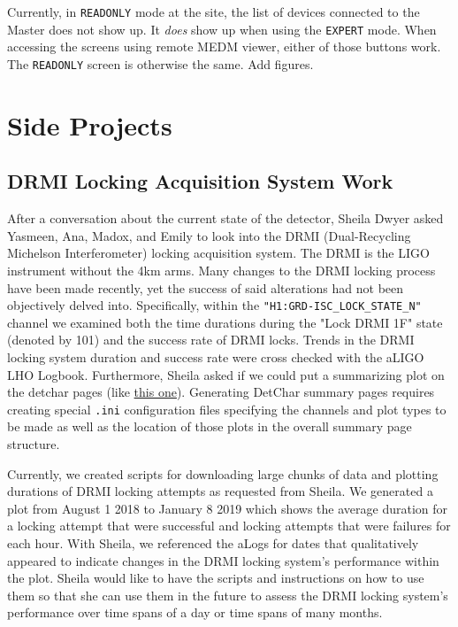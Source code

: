 \documentclass{article}
\newcommand*{\TODO}{\textcolor{todo}}
\begin{document}
Currently, in \texttt{READONLY} mode at the site, the list of devices connected to the Master does not show up. It \textit{does} show up when using the \texttt{EXPERT} mode. When accessing the screens using remote MEDM viewer, either of those buttons work. The \texttt{READONLY} screen is otherwise the same. 
\TODO{Add figures.}

\section{Side Projects}

\TODO{\subsection{DRMI Locking Acquisition System Work}}

After a conversation about the current state of the detector, Sheila Dwyer asked Yasmeen, Ana, Madox, and Emily to look into the DRMI (Dual-Recycling Michelson Interferometer) locking acquisition system. The DRMI is the LIGO instrument without the 4km arms. Many changes to the DRMI locking process have been made recently, yet the success of said alterations had not been objectively delved into. Specifically, within the \texttt{"H1:GRD-ISC\_LOCK\_STATE\_N"} channel we examined both the time durations during the "Lock DRMI 1F" state (denoted by 101) and the success rate of DRMI locks. Trends in the DRMI locking system duration and success rate were cross checked with the aLIGO LHO Logbook. Furthermore, Sheila asked if we could put a summarizing plot on the detchar pages (like \href{https://ldas-jobs.ligo.caltech.edu/~detchar/summary/day/20190111/psl/}{this one}). Generating DetChar summary pages requires creating special \texttt{.ini} configuration files specifying the channels and plot types to be made as well as the location of those plots in the overall summary page structure.

Currently, we created scripts for downloading large chunks of data and plotting durations of DRMI locking attempts as requested from Sheila. We generated a plot from August 1 2018 to January 8 2019 which shows the average duration for a locking attempt that were successful and locking attempts that were failures for each hour. With Sheila, we referenced the aLogs for dates that qualitatively appeared to indicate changes in the DRMI locking system's performance within the plot. Sheila would like to have the scripts and instructions on how to use them so that she can use them in the future to assess the DRMI locking system's performance over time spans of a day or time spans of many months.
\end{document}
